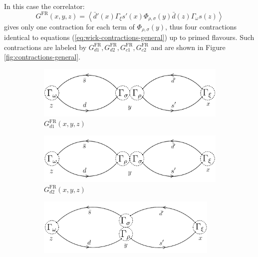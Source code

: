 \documentclass[english, LaM, oneside, noexaminfo]{sapthesis}
\newcommand{\la}{\langle}
\newcommand{\ra}{\rangle}
\begin{document}
In this case the correlator:
\begin{equation*}
    G^\text{FR}(x,y,z) = \left\la \bar d' (x) \Gamma_\xi s'(x) \Phi_{\rho,\sigma}(y) \bar d (z) \Gamma_\omega s(z) \right\ra
\end{equation*}
gives only one contraction for each term of $\Phi_{\rho,\sigma}(y)$, thus four contractions identical to equations (\ref{eq:wick-contractions-general}) up to primed flavours.
Such contractions are labeled by $G_{d1}^\text{FR}, G_{d2}^\text{FR}, G_{c1}^\text{FR}, G_{c2}^\text{FR}$ and are shown in Figure \ref{fig:contractions-general}.
\begin{figure}[h!]
    \centering
    \begin{subfigure}[b]{0.49\textwidth}
        \centering
        \includegraphics[width=\textwidth]{imgs-MSc-thesis/Wick_D1.png}
        \caption{$G_{d1}^\text{FR}(x,y,z)$}
    \end{subfigure}
    \begin{subfigure}[b]{0.49\textwidth}
        \centering
        \includegraphics[width=\textwidth]{imgs-MSc-thesis/Wick_D2.png}
        \caption{$G_{d2}^\text{FR}(x,y,z)$}
    \end{subfigure}
    \begin{subfigure}[b]{0.49\textwidth}
        \centering
        \includegraphics[width=0.95\textwidth]{imgs-MSc-thesis/Wick_C1.png}

\end{subfigure}
\end{figure}
\end{document}

